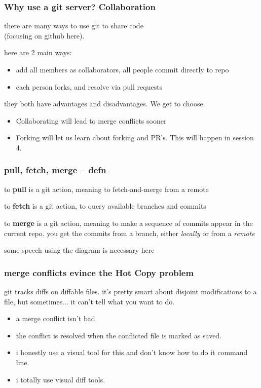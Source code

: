 \documentclass[14pt,aspectratio=1610]{beamer} %
\newcommand{\fframe}[2]{
   \begin{frame}
\frametitle{#1}
#2
\end{frame}
}
\begin{document}
\fframe{Why use a git server? Collaboration}
{

	there are many ways to use git to share code \\(focusing on github here).


	\vspace{\baselineskip}
	here are 2 main ways:

\vspace{\baselineskip}
	\begin{itemize}
	\item add all members as collaborators, all people commit directly to repo
	\item each person forks, and resolve via pull requests
\end{itemize}

\vspace{\baselineskip}

they both have advantages and disadvantages.  We get to choose.
	\begin{itemize}
	\item Collaborating will lead to merge conflicts sooner
	\item Forking will let us learn about forking and PR's.  This will happen in session 4.
\end{itemize}
}





\fframe{pull, fetch, merge -- defn}
{
\begin{definition}
to {\bf pull} is a git action, meaning to fetch-and-merge from a remote
	\end{definition}

	\begin{definition}
to {\bf fetch} is a git action, to query available branches and commits
	\end{definition}

\begin{definition}
to {\bf merge} is a git action, meaning to make a sequence of commits appear in the current repo.  you get the commits from a branch, either {\em locally} or from a {\em remote}
	\end{definition}

	some speech using the diagram is necessary here
}


\fframe{merge conflicts evince the Hot Copy problem}
{
	git tracks diffs on diffable files.  it's pretty smart about disjoint modifications to a file, but sometimes... it can't tell what you want to do.

		\begin{itemize}
	\item a merge conflict isn't bad
	\item the conflict is resolved when the conflicted file is marked as saved.
	\item i honestly use a visual tool for this and don't know how to do it command line.
	\item i totally use visual diff tools.
\end{itemize}
}
\end{document}
